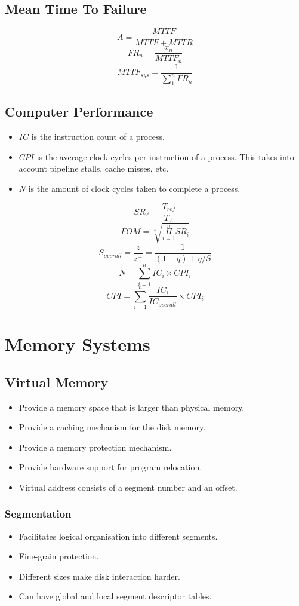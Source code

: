 \documentclass[8pt]{extarticle}
\begin{document}
\begin{multicols}{3}
\subsection{Mean Time To Failure}
\[ A = \frac{MTTF}{MTTF + MTTR} \]
\[ FR_n = \frac{x_{n}}{MTTF_{n}} \]
\[ MTTF_{sys} = \frac{1}{\sum_{1}^{n} FR_{n}} \]

\subsection{Computer Performance}
\begin{itemize}
  \item \(IC\) is the instruction count of a process.
  \item \(CPI\) is the average clock cycles per instruction of a process. This
    takes into account pipeline stalls, cache misses, etc.
  \item \(N\) is the amount of clock cycles taken to complete a process.
\end{itemize}

\[ SR_{A} = \frac{T_{ref}}{T_{A}} \]
\[ FOM = \sqrt[n]{\overset{n}{\underset{i=1}{\Pi}} SR_{i}} \]
\[ S_{overall} = \frac{z}{z^+} = \frac{1}{(1-q) + q / S} \]
\[ N = \sum_{i=1}^{n} IC_{i} \times CPI_{i} \]
\[ CPI = \sum_{i=1}^{n} \frac{IC_{i}}{IC_{overall}} \times CPI_{i} \]

\section{Memory Systems}

\subsection{Virtual Memory}
\begin{itemize}
  \item Provide a memory space that is larger than physical memory.
  \item Provide a caching mechanism for the disk memory.
  \item Provide a memory protection mechanism.
  \item Provide hardware support for program relocation.
  \item Virtual address consists of a segment number and an offset.
\end{itemize}

\subsubsection{Segmentation}
\begin{itemize}
  \item Facilitates logical organisation into different segments.
  \item Fine-grain protection.
  \item Different sizes make disk interaction harder.
  \item Can have global and local segment descriptor tables.
\end{itemize}


\end{multicols}
\end{document}
